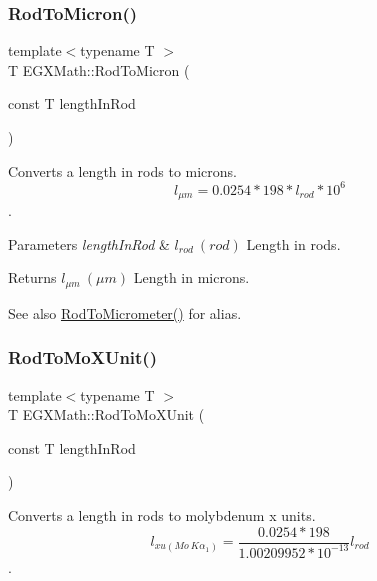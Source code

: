 \subsubsection{\texorpdfstring{Rod\+To\+Micron()}{RodToMicron()}}
{\footnotesize\ttfamily template$<$typename T $>$ \\
T E\+G\+X\+Math\+::\+Rod\+To\+Micron (\begin{DoxyParamCaption}\item[{const T}]{length\+In\+Rod }\end{DoxyParamCaption})}



Converts a length in rods to microns. \[ l_{\mu m}=0.0254 * 198 * l_{rod} * 10^{6} \]. 


\begin{DoxyParams}{Parameters}
{\em length\+In\+Rod} & $ l_{rod}\ (rod)$ Length in rods. \\
\hline
\end{DoxyParams}
\begin{DoxyReturn}{Returns}
$ l_{\mu m}\ (\mu m)$ Length in microns. 
\end{DoxyReturn}
\begin{DoxySeeAlso}{See also}
\mbox{\hyperlink{group___e_g_x_math-_conversions-_length_conversions-_imperial-_rod-_s_i_ga8821e67ddd408e4b4b9c4d1512b6a9d8}{Rod\+To\+Micrometer()}} for alias. 
\end{DoxySeeAlso}
\mbox{\label{group___e_g_x_math-_conversions-_length_conversions-_imperial-_rod-_non-_s_i_gac5c3c27eea891ef32353d16c6b8c57ab}} 
\subsubsection{\texorpdfstring{Rod\+To\+Mo\+X\+Unit()}{RodToMoXUnit()}}
{\footnotesize\ttfamily template$<$typename T $>$ \\
T E\+G\+X\+Math\+::\+Rod\+To\+Mo\+X\+Unit (\begin{DoxyParamCaption}\item[{const T}]{length\+In\+Rod }\end{DoxyParamCaption})}



Converts a length in rods to molybdenum x units. \[ l_{xu(Mo\ K\alpha_1)}=\frac{0.0254 * 198}{1.00209952*10^{-13}} l_{rod}\]. 


